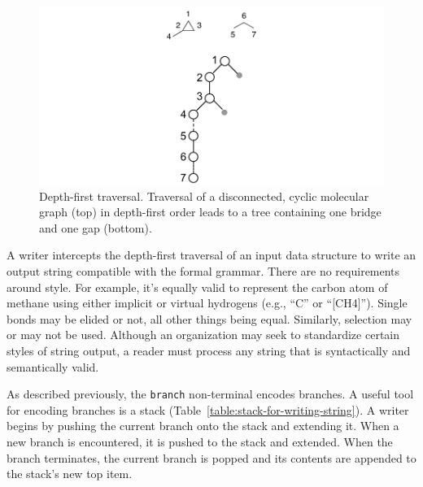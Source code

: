 \documentclass{article}
\def\ttt{\texttt}
\begin{document}
\begin{figure}
    \centering
    \includegraphics[width=\columnwidth]{depth-first-traversal.pdf}
    \caption{Depth-first traversal. Traversal of a disconnected, cyclic molecular graph (top) in depth-first order leads to a tree containing one bridge and one gap (bottom).}
    \label{fig:depth-first-traversal}
\end{figure}

A writer intercepts the depth-first traversal of an input data structure to write an output string compatible with the formal grammar. There are no requirements around style. For example, it's equally valid to represent the carbon atom of methane using either implicit or virtual hydrogens (e.g., \enquote{C} or \enquote{[CH4]}). Single bonds may be elided or not, all other things being equal. Similarly, selection may or may not be used. Although an organization may seek to standardize certain styles of string output, a reader must process any string that is syntactically and semantically valid.

As described previously, the \ttt{branch} non-terminal encodes branches. A useful tool for encoding branches is a stack (Table~\ref{table:stack-for-writing-string}). A writer begins by pushing the current branch onto the stack and extending it. When a new branch is encountered, it is pushed to the stack and extended. When the branch terminates, the current branch is popped and its contents are appended to the stack's new top item.
\end{document}
